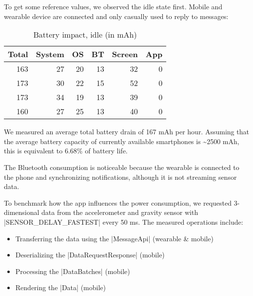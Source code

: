 To get some reference values, we observed the idle state first.
Mobile and wearable device are connected and only casually used to reply to messages:

\begin{table}[H]
    \centering
    \begin{tabular}{rrrrrr}
        Total    & System   & OS       & BT       & Screen   & App  \\ \hline

        163      & 27       & 20       & 13       & 32       & 0    \\
        173      & 30       & 22       & 15       & 52       & 0    \\
        173      & 34       & 19       & 13       & 39       & 0    \\
        160      & 27       & 25       & 13       & 40       & 0    \\
    \end{tabular}
    \caption{Battery impact, idle (in mAh)}
    \label{table:benchmark:battery:idle}
\end{table}

We measured an average total battery drain of 167 mAh per hour.
Assuming that the average battery capacity of currently available smartphones is \textasciitilde2500 mAh, this is equivalent to 6.68\% of battery life.

The Bluetooth consumption is noticeable because the wearable is connected to the phone and synchronizing notifications, although it is not streaming sensor data.

To benchmark how the app influences the power consumption, we requested 3-dimensional data from the accelerometer and gravity sensor with \\|SENSOR_DELAY_FASTEST| every 50 ms. The measured operations include:

\begin{itemize}[noitemsep]
    \item Transferring the data using the |MessageApi| (wearable \& mobile)
    \item Deserializing the |DataRequestResponse| (mobile)
    \item Processing the |DataBatches| (mobile)
    \item Rendering the |Data|\cite{sensordatalogger:data} (mobile)
\end{itemize}

